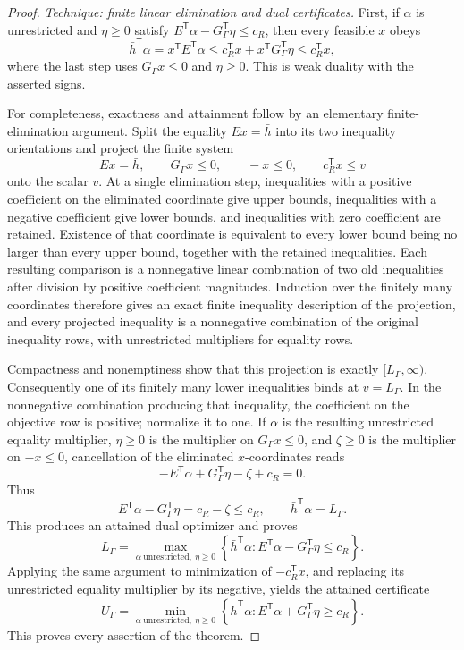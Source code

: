 \documentclass{article}
\begin{document}
\begin{proof}
\emph{Technique: finite linear elimination and dual certificates.}
First, if \(\alpha\) is unrestricted and \(\eta\geq0\) satisfy
\(E^{\mathsf T}\alpha-G_{\Gamma}^{\mathsf T}\eta\leq c_R\), then every feasible \(x\) obeys
\[
\bar h^{\mathsf T}\alpha
=x^{\mathsf T}E^{\mathsf T}\alpha
\leq c_R^{\mathsf T}x+x^{\mathsf T}G_{\Gamma}^{\mathsf T}\eta
\leq c_R^{\mathsf T}x,
\]
where the last step uses \(G_{\Gamma}x\leq0\) and \(\eta\geq0\).  This is weak duality with the asserted signs.

For completeness, exactness and attainment follow by an elementary finite-elimination argument.  Split the equality \(Ex=\bar h\) into its two inequality orientations and project the finite system
\[
Ex=\bar h,
\qquad G_{\Gamma}x\leq0,
\qquad -x\leq0,
\qquad c_R^{\mathsf T}x\leq v
\]
onto the scalar \(v\).  At a single elimination step, inequalities with a positive coefficient on the eliminated coordinate give upper bounds, inequalities with a negative coefficient give lower bounds, and inequalities with zero coefficient are retained.  Existence of that coordinate is equivalent to every lower bound being no larger than every upper bound, together with the retained inequalities.  Each resulting comparison is a nonnegative linear combination of two old inequalities after division by positive coefficient magnitudes.  Induction over the finitely many coordinates therefore gives an exact finite inequality description of the projection, and every projected inequality is a nonnegative combination of the original inequality rows, with unrestricted multipliers for equality rows.

Compactness and nonemptiness show that this projection is exactly \([L_{\Gamma},\infty)\).  Consequently one of its finitely many lower inequalities binds at \(v=L_{\Gamma}\).  In the nonnegative combination producing that inequality, the coefficient on the objective row is positive; normalize it to one.  If \(\alpha\) is the resulting unrestricted equality multiplier, \(\eta\geq0\) is the multiplier on \(G_{\Gamma}x\leq0\), and \(\zeta\geq0\) is the multiplier on \(-x\leq0\), cancellation of the eliminated \(x\)-coordinates reads
\[
-E^{\mathsf T}\alpha+G_{\Gamma}^{\mathsf T}\eta-\zeta+c_R=0.
\]
Thus
\[
E^{\mathsf T}\alpha-G_{\Gamma}^{\mathsf T}\eta
=c_R-\zeta\leq c_R,
\qquad
\bar h^{\mathsf T}\alpha=L_{\Gamma}.
\]
This produces an attained dual optimizer and proves
\[
L_{\Gamma}
=\max_{\alpha\ \mathrm{unrestricted},\ \eta\geq0}
\left\{\bar h^{\mathsf T}\alpha:
E^{\mathsf T}\alpha-G_{\Gamma}^{\mathsf T}\eta\leq c_R\right\}.
\]
Applying the same argument to minimization of \(-c_R^{\mathsf T}x\), and replacing its unrestricted equality multiplier by its negative, yields the attained certificate
\[
U_{\Gamma}
=\min_{\alpha\ \mathrm{unrestricted},\ \eta\geq0}
\left\{\bar h^{\mathsf T}\alpha:
E^{\mathsf T}\alpha+G_{\Gamma}^{\mathsf T}\eta\geq c_R\right\}.
\]
This proves every assertion of the theorem.
\end{proof}
\end{document}
